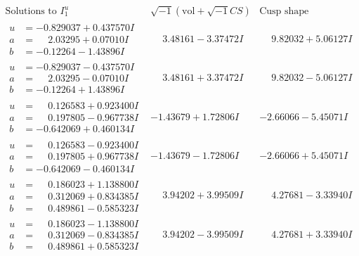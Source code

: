 \documentclass[1p]{elsarticle_modified}
\theoremstyle{definition}
\newcommand{\I}{\sqrt{-1}}
\begin{document}
$$\begin{array}{c|c|c}  
\text{Solutions to }I^u_{1}& \I (\text{vol} + \sqrt{-1}CS) & \text{Cusp shape}\\
 \hline 
\begin{aligned}
u &= -0.829037 + 0.437570 I \\
a &= \phantom{-}2.03295 + 0.07010 I \\
b &= -0.12264 - 1.43896 I\end{aligned}
 & \phantom{-}3.48161 - 3.37472 I & \phantom{-}9.82032 + 5.06127 I \\ \hline\begin{aligned}
u &= -0.829037 - 0.437570 I \\
a &= \phantom{-}2.03295 - 0.07010 I \\
b &= -0.12264 + 1.43896 I\end{aligned}
 & \phantom{-}3.48161 + 3.37472 I & \phantom{-}9.82032 - 5.06127 I \\ \hline\begin{aligned}
u &= \phantom{-}0.126583 + 0.923400 I \\
a &= \phantom{-}0.197805 - 0.967738 I \\
b &= -0.642069 + 0.460134 I\end{aligned}
 & -1.43679 + 1.72806 I & -2.66066 - 5.45071 I \\ \hline\begin{aligned}
u &= \phantom{-}0.126583 - 0.923400 I \\
a &= \phantom{-}0.197805 + 0.967738 I \\
b &= -0.642069 - 0.460134 I\end{aligned}
 & -1.43679 - 1.72806 I & -2.66066 + 5.45071 I \\ \hline\begin{aligned}
u &= \phantom{-}0.186023 + 1.138800 I \\
a &= \phantom{-}0.312069 + 0.834385 I \\
b &= \phantom{-}0.489861 - 0.585323 I\end{aligned}
 & \phantom{-}3.94202 + 3.99509 I & \phantom{-}4.27681 - 3.33940 I \\ \hline\begin{aligned}
u &= \phantom{-}0.186023 - 1.138800 I \\
a &= \phantom{-}0.312069 - 0.834385 I \\
b &= \phantom{-}0.489861 + 0.585323 I\end{aligned}
 & \phantom{-}3.94202 - 3.99509 I & \phantom{-}4.27681 + 3.33940 I \\ \hline\begin{aligned}

\end{aligned}
\end{array}$$
\end{document}
